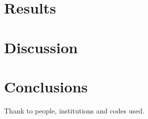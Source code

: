 \documentclass[twocolumn]{aa}
\begin{document}
\section{Results}

\section{Discussion}

\section{Conclusions}




\begin{acknowledgements}
    Thank to people, institutions and codes used.
\end{acknowledgements}

%
%
%
\end{document}
